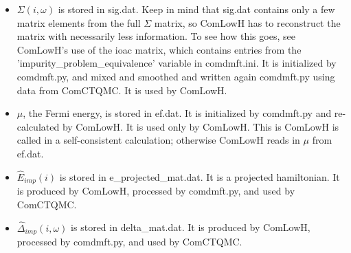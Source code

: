 \documentclass[aps,prb,singlecolumn,preprintnumbers,amsmath,amssymb]{revtex4}
\begin{document}
\begin{itemize}
\item $\Sigma(i,\omega)$ is stored in sig.dat.   Keep in mind that sig.dat contains only a few matrix elements from the full $\Sigma$ matrix, so ComLowH has to reconstruct the matrix with necessarily less information.  To see how this goes, see ComLowH's use of the ioac matrix, which contains entries from the 'impurity\_problem\_equivalence' variable in comdmft.ini.  It is initialized by comdmft.py, and mixed and smoothed  and written again comdmft.py using data from ComCTQMC.  It is used by ComLowH.
\item $\mu$, the Fermi energy, is stored in ef.dat.  It is initialized by comdmft.py and re-calculated by ComLowH.  It is used only  by ComLowH.   This is ComLowH is called in a self-consistent calculation; otherwise ComLowH reads in $\mu$ from ef.dat.
\item $\hat{E}_{imp}(i)$ is stored in e\_projected\_mat.dat. It is  a projected hamiltonian. It is produced by ComLowH, processed by comdmft.py, and used by ComCTQMC.
\item $\hat{\Delta}_{imp}(i,\omega)$ is stored in delta\_mat.dat. It is produced by ComLowH, processed by comdmft.py, and used by ComCTQMC.

\end{itemize}
\end{document}

